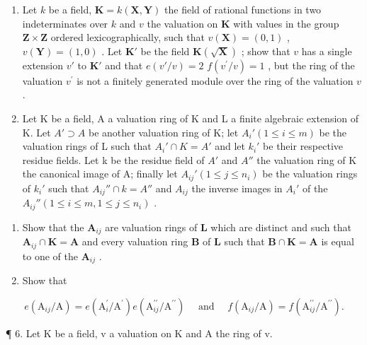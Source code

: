 \begin{enumerate}
\def\labelenumi{\arabic{enumi}.}
\setcounter{enumi}{3}
\item
  Let \(k\) be a field, \(\mathbf{K} = k(\mathbf{X}, \mathbf{Y})\) the field of rational functions in two indeterminates over \(k\) and \(v\) the valuation on \(\mathbf{K}\) with values in the group \(\mathbf{Z} \times \mathbf{Z}\) ordered lexicographically, such that \(v(\mathbf{X}) = (0, 1)\) , \(v(\mathbf{Y}) = (1, 0)\) . Let \(\mathbf{K}'\) be the field \(\mathbf{K}(\sqrt{\mathbf{X}})\) ; show that \(v\) has a single extension \(v'\) to \(\mathbf{K}'\) and that \(e(v'/v) = 2\) \(f(v^{\prime}/v)=1\) , but the ring of the valuation \(v^{\prime}\) is not a finitely generated module over the ring of the valuation \(v\) .
\item
  Let K be a field, A a valuation ring of K and L a finite algebraic extension of K. Let \(A' \supset A\) be another valuation ring of K; let \(A_i' (1 \leqslant i \leqslant m)\) be the valuation rings of L such that \(A_i' \cap K = A'\) and let \(k_i'\) be their respective residue fields. Let k be the residue field of \(A'\) and \(A''\) the valuation ring of K the canonical image of A; finally let \(A_{ij}' (1 \leqslant j \leqslant n_i)\) be the valuation rings of \(k_i'\) such that \(A_{ij}'' \cap k = A''\) and \(A_{ij}\) the inverse images in \(A_i'\) of the \(A_{ij}'' (1 \leqslant i \leqslant m, 1 \leqslant j \leqslant n_i)\) .
\end{enumerate}

\begin{enumerate}
\def\labelenumi{(\alph{enumi})}
\item
  Show that the \(\mathbf{A}_{ij}\) are valuation rings of \(\mathbf{L}\) which are distinct and such that \(\mathbf{A}_{ij} \cap \mathbf{K} = \mathbf{A}\) and every valuation ring \(\mathbf{B}\) of \(\mathbf{L}\) such that \(\mathbf{B} \cap \mathbf{K} = \mathbf{A}\) is equal to one of the \(\mathbf{A}_{ij}\) .
\item
  Show that
\end{enumerate}

\[
e \left(\mathrm{A} _ {i j} / \mathrm{A}\right) = e \left(\mathrm{A} _ {i} ^ {\prime} / \mathrm{A} ^ {\prime}\right) e \left(\mathrm{A} _ {i j} ^ {\prime \prime} / \mathrm{A} ^ {\prime \prime}\right) \quad \text { and } \quad f \left(\mathrm{A} _ {i j} / \mathrm{A}\right) = f \left(\mathrm{A} _ {i j} ^ {\prime \prime} / \mathrm{A} ^ {\prime \prime}\right).
\]

¶ 6. Let K be a field, v a valuation on K and A the ring of v.


